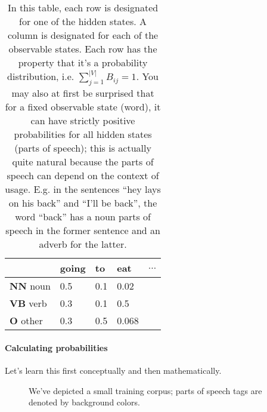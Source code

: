 \documentclass[12pt]{article}
\begin{document}
\begin{table}[h!]
\begin{center}
  \begin{tabular}{| l | l | l | l | l |}
    \hline
    & \textbf{going} & \textbf{to} & \textbf{eat} & $\ldots$ \\
    \hline
    \textbf{NN} {\color{gray!80} noun} & 0.5 & 0.1 & 0.02 & \\
    \textbf{VB} {\color{gray!80} verb} &  0.3 & 0.1 & 0.5 &  \\
    \textbf{O}  {\color{gray!80} other} & 0.3 & 0.5 & 0.068 & \\
    \hline
  \end{tabular}
  \caption{\small In this table, each row is designated for one of the hidden states. A column is designated for each of the observable states. Each row has the property that it's a probability distribution, i.e. $\sum_{j=1}^{|V|} B_{ij} = 1$. You may also at first be surprised that for a fixed observable state (word), it can have strictly positive probabilities for all hidden states (parts of speech); this is actually quite natural because the parts of speech can depend on the context of usage. E.g. in the sentences ``hey lays on his back'' and ``I'll be back'', the word ``back'' has a noun parts of speech in the former sentence and an adverb for the latter.}
\end{center}
\end{table}

\vspace{-20pt}
\paragraph{Calculating probabilities}
Let's learn this first conceptually and then mathematically.

\begin{figure}[h]
  \begin{center}
    \label{fig: trainingcorpuspos}
    \caption{We've depicted a small training corpus; parts of speech tags are denoted by background colors.}
\end{center}  
\end{figure}
\end{document}
